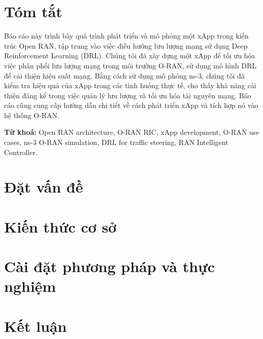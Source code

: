 \documentclass[12pt]{report}
\begin{document}
\chapter*{Tóm tắt}
Báo cáo này trình bày quá trình phát triển và mô phỏng một xApp trong kiến trúc Open RAN, tập trung vào việc điều hướng lưu lượng mạng sử dụng Deep Reinforcement Learning (DRL). Chúng tôi đã xây dựng một xApp để tối ưu hóa việc phân phối lưu lượng mạng trong môi trường O-RAN, sử dụng mô hình DRL để cải thiện hiệu suất mạng. Bằng cách sử dụng mô phỏng ns-3, chúng tôi đã kiểm tra hiệu quả của xApp trong các tình huống thực tế, cho thấy khả năng cải thiện đáng kể trong việc quản lý lưu lượng và tối ưu hóa tài nguyên mạng. Báo cáo cũng cung cấp hướng dẫn chi tiết về cách phát triển xApp và tích hợp nó vào hệ thống O-RAN.

\textbf{Từ khoá:} Open RAN architecture, O-RAN RIC, xApp development, O-RAN use cases, ns-3 O-RAN simulation, DRL for traffic steering, RAN Intelligent Controller.

\tableofcontents





\chapter{Đặt vấn đề}


\chapter{Kiến thức cơ sở}




% 

\chapter{Cài đặt phương pháp và thực nghiệm}







\chapter{Kết luận}


% 

\printbibliography[heading=bibintoc]
\end{document}
